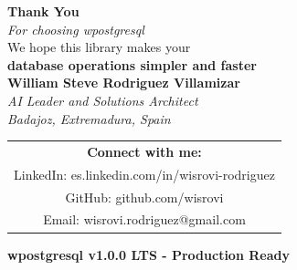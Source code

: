 \documentclass[12pt,a4paper]{report}
\begin{document}
\begin{titlepage}
	\centering
	\vspace*{3cm}
	{\color{blue!70!black}\Huge\textbf{Thank You}}\\[2cm]
	{\Large\textit{For choosing wpostgresql}}\\[1cm]
	{\large We hope this library makes your}\\[0.3cm]
	{\large\textbf{database operations simpler and faster}}\\[2cm]
	{\large\textbf{William Steve Rodriguez Villamizar}}\\[0.5cm]
	\textit{AI Leader and Solutions Architect}\\[0.3cm]
	\textit{Badajoz, Extremadura, Spain}\\[1cm]
	\begin{tabular}{c}
		\textbf{Connect with me:}                      \\[0.5cm]
		LinkedIn: es.linkedin.com/in/wisrovi-rodriguez \\[0.2cm]
		GitHub: github.com/wisrovi                     \\[0.2cm]
		Email: wisrovi.rodriguez@gmail.com
	\end{tabular}
	\vfill
	\colorbox{blue!70!black}{
		\color{white}\textbf{wpostgresql v1.0.0 LTS - Production Ready}
	}
\end{titlepage}
\end{document}
